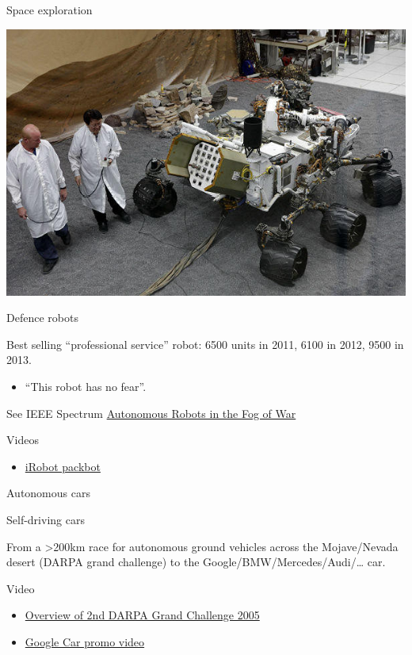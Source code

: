 \documentclass[compress]{beamer}
\begin{document}
\begin{frame}{Space exploration}
\begin{multicols}{2}
\begin{center}
            \includegraphics[width=0.6\linewidth]{space-robot-curiosity}
        \end{center}
    \end{multicols}
\end{frame}

\begin{frame}{Defence robots}

Best selling ``professional service'' robot: 6500 units in 2011, 6100 in
2012, 9500 in 2013.

\begin{itemize}
\item
  ``This robot has no fear''.
\end{itemize}

See IEEE Spectrum
\href{http://spectrum.ieee.org/robotics/military-robots/autonomous-robots-in-the-fog-of-war/0}{Autonomous
Robots in the Fog of War}

Videos

\begin{itemize}
\item
  \href{http://youtu.be/eaP0waiz43w}{iRobot packbot}
\end{itemize}

\end{frame}

\begin{frame}{Autonomous cars}

Self-driving cars

From a \textgreater{}200km race for autonomous ground vehicles across
the Mojave/Nevada desert (DARPA grand challenge) to the
Google/BMW/Mercedes/Audi/\ldots{} car.

Video

\begin{itemize}
\item
  \href{http://youtu.be/M2AcMnfzpNg}{Overview of 2nd DARPA Grand
  Challenge 2005}
\item
  \href{http://youtu.be/cdgQpa1pUUE}{Google Car promo video}
\end{itemize}

\end{frame}
\end{document}
